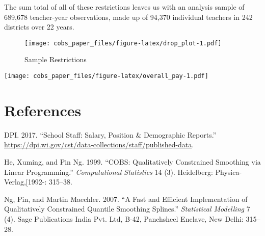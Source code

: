 \documentclass[]{article}
\begin{document}
The sum total of all of these restrictions leaves us with an analysis
sample of 689,678 teacher-year observations, made up of 94,370
individual teachers in 242 districts over 22 years.

\begin{figure}[htbp]
\centering
\texttt{[image: cobs\_paper\_files/figure-latex/drop\_plot-1.pdf]}
\caption{\label{fig:samp_res}Sample Restrictions}
\end{figure}

\texttt{[image: cobs\_paper\_files/figure-latex/overall\_pay-1.pdf]}

\section{References}\label{references}



\hypertarget{refs}{}
\hypertarget{ref-dpi}{}
DPI. 2017. ``School Staff: Salary, Position \& Demographic Reports.''
\url{https://dpi.wi.gov/cst/data-collections/staff/published-data}.

\hypertarget{ref-he}{}
He, Xuming, and Pin Ng. 1999. ``COBS: Qualitatively Constrained
Smoothing via Linear Programming.'' \emph{Computational Statistics} 14
(3). Heidelberg: Physica-Verlag,{[}1992-: 315--38.

\hypertarget{ref-ng}{}
Ng, Pin, and Martin Maechler. 2007. ``A Fast and Efficient
Implementation of Qualitatively Constrained Quantile Smoothing
Splines.'' \emph{Statistical Modelling} 7 (4). Sage Publications India
Pvt. Ltd, B-42, Panchsheel Enclave, New Delhi: 315--28.
\end{document}
